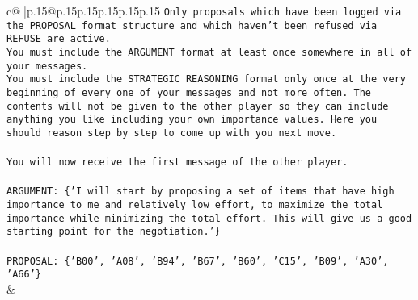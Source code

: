 \documentclass{article}
\begin{document}
{\begin{supertabular}{c@{$\;$}|p{.15\linewidth}@{}p{.15\linewidth}p{.15\linewidth}p{.15\linewidth}p{.15\linewidth}p{.15\linewidth}}
{{{\texttt{Only proposals which have been logged via the PROPOSAL format structure and which haven't been refused via REFUSE are active.} \\
\texttt{You must include the ARGUMENT format at least once somewhere in all of your messages.} \\
\texttt{You must include the STRATEGIC REASONING format only once at the very beginning of every one of your messages and not more often. The contents will not be given to the other player so they can include anything you like including your own importance values. Here you should reason step by step to come up with you next move.} \\
\\ 
\texttt{You will now receive the first message of the other player.} \\
\\ 
\texttt{ARGUMENT: \{'I will start by proposing a set of items that have high importance to me and relatively low effort, to maximize the total importance while minimizing the total effort. This will give us a good starting point for the negotiation.'\}} \\
\\ 
\texttt{PROPOSAL: \{'B00', 'A08', 'B94', 'B67', 'B60', 'C15', 'B09', 'A30', 'A66'\}} \\
            }
        }
    }
    & \\ \\


\end{supertabular}}
\end{document}
